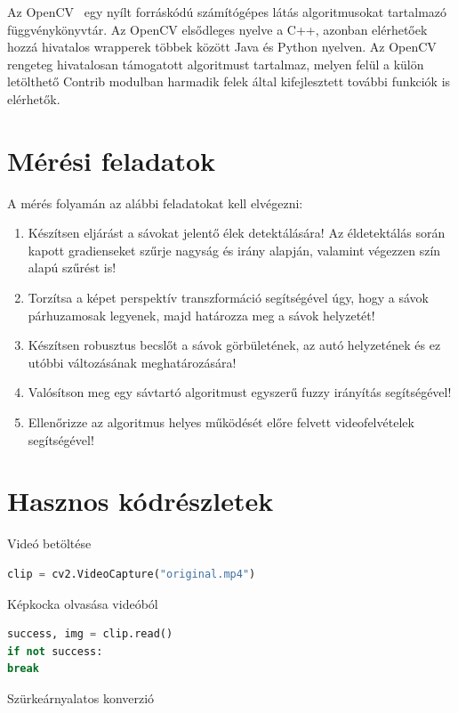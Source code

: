 \documentclass[12pt,a4paper,oneside]{report}             %
\begin{document}
Az OpenCV~\cite{opencv} egy nyílt forráskódú számítógépes látás algoritmusokat tartalmazó függvénykönyvtár. Az OpenCV elsődleges nyelve a C++, azonban elérhetőek hozzá hivatalos wrapperek többek között Java és Python nyelven. Az OpenCV rengeteg hivatalosan támogatott algoritmust tartalmaz, melyen felül a külön letölthető Contrib modulban harmadik felek által kifejlesztett további funkciók is elérhetők.

\chapter{Mérési feladatok}

A mérés folyamán az alábbi feladatokat kell elvégezni:

\begin{enumerate}
\item Készítsen eljárást a sávokat jelentő élek detektálására! Az éldetektálás során kapott gradienseket szűrje nagyság és irány alapján, valamint végezzen szín alapú szűrést is!
\item Torzítsa a képet perspektív transzformáció segítségével úgy, hogy a sávok párhuzamosak legyenek, majd határozza meg a sávok helyzetét!
\item Készítsen robusztus becslőt a sávok görbületének, az autó helyzetének és ez utóbbi változásának meghatározására!
\item Valósítson meg egy sávtartó algoritmust egyszerű fuzzy irányítás segítségével!
\item Ellenőrizze az algoritmus helyes működését előre felvett videofelvételek segítségével!
\end{enumerate}

\chapter{Hasznos kódrészletek}

Videó betöltése

\begin{lstlisting}[language=Python]
clip = cv2.VideoCapture("original.mp4")
\end{lstlisting}

Képkocka olvasása videóból

\begin{lstlisting}[language=Python]
success, img = clip.read()
if not success:
break
\end{lstlisting}

Szürkeárnyalatos konverzió
\end{document}
